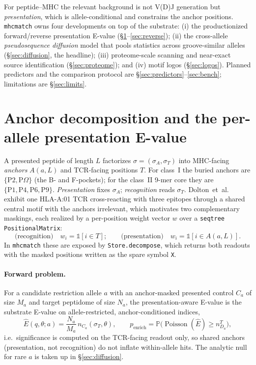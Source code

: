 \documentclass[11pt]{article}
\theoremstyle{oldplain}
\theoremstyle{oldrem}
\DeclareMathOperator{\Poisson}{Poisson}
\newcommand{\Prob}{\mathbb{P}}
\newcommand{\one}{\mathds{1}}
\begin{document}
For peptide--MHC the relevant background is not V(D)J generation but \emph{presentation}, which is
allele-conditional and constrains the anchor positions. \texttt{mhcmatch} owns four developments on
top of the substrate: (i) the productionized forward/reverse presentation E-value
(\S\ref{sec:forward}--\ref{sec:reverse}); (ii) the cross-allele \emph{pseudosequence diffusion}
model that pools statistics across groove-similar alleles (\S\ref{sec:diffusion}, the headline);
(iii) proteome-scale scanning and near-exact source identification (\S\ref{sec:proteome}); and
(iv) motif logos (\S\ref{sec:logos}). Planned predictors and the comparison protocol are
\S\ref{sec:predictors}--\ref{sec:bench}; limitations are \S\ref{sec:limits}.

\section{Anchor decomposition and the per-allele presentation E-value}\label{sec:forward}
A presented peptide of length $L$ factorizes $\sigma=(\sigma_A,\sigma_T)$ into MHC-facing
\emph{anchors} $A(a,L)$ and TCR-facing positions $T$. For class~I the buried anchors are
$\{\mathrm{P2},\mathrm{P}\Omega\}$ (the B- and F-pockets); for the class~II 9-mer core they are
$\{\mathrm{P1},\mathrm{P4},\mathrm{P6},\mathrm{P9}\}$. \emph{Presentation} fixes $\sigma_A$;
\emph{recognition} reads $\sigma_T$. Dolton~et~al.~\cite{Dolton2023} exhibit one HLA-A:01 TCR
cross-reacting with three epitopes through a shared central motif with the anchors irrelevant, which
motivates two complementary maskings, each realized by a per-position weight vector $w$ over a
\texttt{seqtree} \texttt{PositionalMatrix}:
\begin{equation}\label{eq:masks}
  \text{(recognition)}\quad w_i=\one[i\in T];\qquad
  \text{(presentation)}\quad w_i=\one[i\in A(a,L)].
\end{equation}
In \texttt{mhcmatch} these are exposed by \texttt{Store.decompose}, which returns both readouts with
the masked positions written as the spare symbol \texttt{X}.

\paragraph{Forward problem.} For a candidate restriction allele $a$ with an anchor-masked presented
control $C_a$ of size $M_a$ and target peptidome of size $N_a$, the presentation-aware E-value is the
substrate E-value on allele-restricted, anchor-conditioned indices,
\begin{equation}\label{eq:forward}
  \widehat E(q,\theta;a)=\frac{N_a}{M_a}\,n_{C_a}(\sigma_T,\theta),\qquad
  p_{\mathrm{enrich}}=\Prob\!\big(\Poisson(\widehat E)\ge n^T_{D_a}\big),
\end{equation}
i.e.\ significance is computed on the TCR-facing readout only, so shared anchors (presentation, not
recognition) do not inflate within-allele hits. The analytic null for rare $a$ is taken up in
\S\ref{sec:diffusion}.
\end{document}
